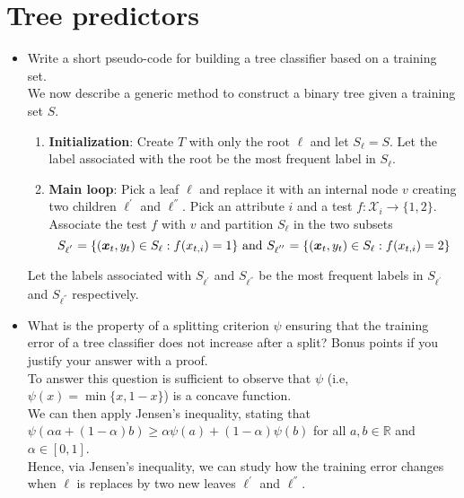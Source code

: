 \newpage
\section{Tree predictors}

\begin{itemize}
    
    \item Write a short pseudo-code for building a tree classifier based on a training set.\\
       
    We now describe a generic method to construct a binary tree given a training set $S$.\\
    \begin{enumerate}
    \item \textbf{Initialization}: Create $T$ with only the root $\ell$ and let $S_{\ell} = S$. Let the label associated with the root be the most frequent label in $S_{\ell}$. 
    \item \textbf{Main loop}: Pick a leaf $\ell$ and replace it with an internal node $v$ creating two children $\ell^{'}$ and $\ell^{''}$. Pick an attribute $i$ and a test $f : \mathcal{X}_i \rightarrow \{1,2\}$. Associate the test $f$ with $v$ and partition $S_{\ell}$ in the two subsets\\
        $$S_{\ell^{'}} = \{(\boldsymbol{x}_t, y_t) \in S_{\ell} : f(x_{t,i}) = 1\}\ \textmd{and}\ S_{\ell^{''}} = \{(\boldsymbol{x}_t, y_t)\in S_{\ell} : f(x_{t,i}) = 2\}$$ 
    \end{enumerate}
    Let the labels associated with $S_{\ell^{'}}$ and $S_{\ell^{''}}$ be the most frequent labels in $S_{\ell^{'}}$ and $S_{\ell^{''}}$ respectively.\\ 

    \item What is the property of a splitting criterion $\psi$ ensuring that the training error of a tree classifier does not increase after a split? Bonus points if you justify your answer with a proof.\\

        To answer this question is sufficient to observe that $\psi$ (i.e, $\psi(x) = \min{\{x, 1 - x\}}$) is a concave function.\\
    We can then apply Jensen’s inequality, stating that $\psi(\alpha a + (1-\alpha)b) \geq \alpha\psi(a) + (1 - \alpha)\psi(b)$ for all $a,b \in \mathbb{R}$ and $\alpha \in [0,1]$.\\

    Hence, via Jensen's inequality, we can study how the training error changes when $\ell$ is replaces by two new leaves $\ell^{'}$ and $\ell^{''}$.\\
    

\end{itemize}

